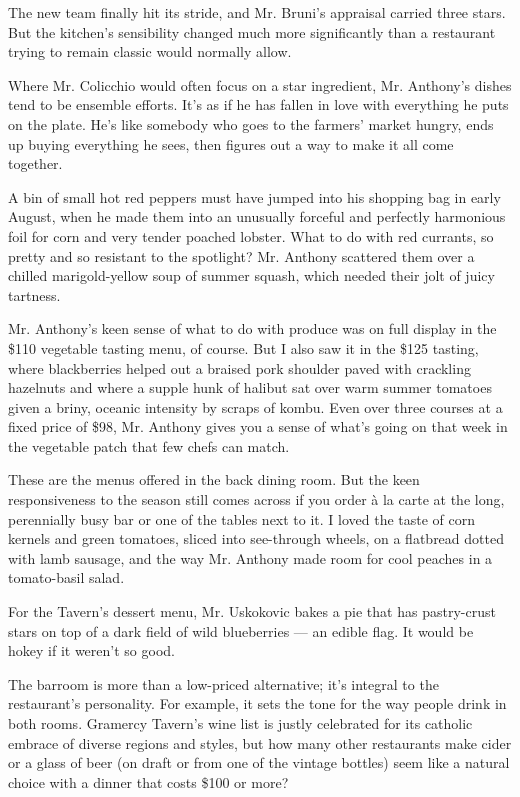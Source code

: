 The new team finally hit its stride, and Mr. Bruni's appraisal carried
three stars. But the kitchen's sensibility changed much more
significantly than a restaurant trying to remain classic would normally
allow.

Where Mr. Colicchio would often focus on a star ingredient, Mr.
Anthony's dishes tend to be ensemble efforts. It's as if he has fallen
in love with everything he puts on the plate. He's like somebody who
goes to the farmers' market hungry, ends up buying everything he sees,
then figures out a way to make it all come together.

A bin of small hot red peppers must have jumped into his shopping bag in
early August, when he made them into an unusually forceful and perfectly
harmonious foil for corn and very tender poached lobster. What to do
with red currants, so pretty and so resistant to the spotlight? Mr.
Anthony scattered them over a chilled marigold-yellow soup of summer
squash, which needed their jolt of juicy tartness.

Mr. Anthony's keen sense of what to do with produce was on full display
in the \$110 vegetable tasting menu, of course. But I also saw it in the
\$125 tasting, where blackberries helped out a braised pork shoulder
paved with crackling hazelnuts and where a supple hunk of halibut sat
over warm summer tomatoes given a briny, oceanic intensity by scraps of
kombu. Even over three courses at a fixed price of \$98, Mr. Anthony
gives you a sense of what's going on that week in the vegetable patch
that few chefs can match.

These are the menus offered in the back dining room. But the keen
responsiveness to the season still comes across if you order à la carte
at the long, perennially busy bar or one of the tables next to it. I
loved the taste of corn kernels and green tomatoes, sliced into
see-through wheels, on a flatbread dotted with lamb sausage, and the way
Mr. Anthony made room for cool peaches in a tomato-basil salad.

For the Tavern's dessert menu, Mr. Uskokovic bakes a pie that has
pastry-crust stars on top of a dark field of wild blueberries --- an
edible flag. It would be hokey if it weren't so good.

The barroom is more than a low-priced alternative; it's integral to the
restaurant's personality. For example, it sets the tone for the way
people drink in both rooms. Gramercy Tavern's wine list is justly
celebrated for its catholic embrace of diverse regions and styles, but
how many other restaurants make cider or a glass of beer (on draft or
from one of the vintage bottles) seem like a natural choice with a
dinner that costs \$100 or more?

